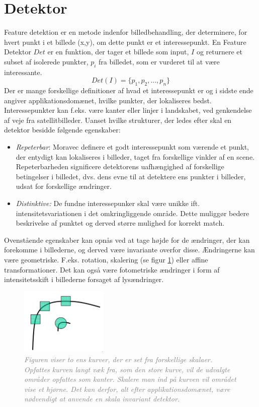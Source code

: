 \section{Detektor}\label{sec:detect}
Feature detektion er en metode indenfor billedbehandling, der determinere, for hvert punkt i et billede (x,y), om dette punkt er et interessepunkt.  En Feature Detektor $Det$ er en funktion, der tager et billede som input, $I$ og returnere et subset af isolerede punkter, $p_i$ fra billedet, som er vurderet til at være interessante. 
$$ Det(I)=\lbrace p_1,p_2,...,p_n \rbrace$$
Der er mange forskellige definitioner af hvad et interessepunkt er og i sidste ende angiver applikationsdomænet, hvilke punkter, der lokaliseres bedst. Interessepunkter kan f.eks. være kanter eller linjer i landskabet, ved genkendelse af veje fra satellitbilleder. Uanset hvilke strukturer, der ledes efter skal en detektor besidde følgende egenskaber:
\begin{itemize}
\item{\emph{Repeterbar}: Moravec \cite{moravec} definere et godt interessepunkt som værende et punkt, der entydigt kan lokaliseres i billeder, taget fra forskellige vinkler af en scene. Repeterbarheden significere detektorens uafhængighed af forskellige betingelser i billedet, dvs. dens evne til at detektere ens punkter i billeder, udsat for forskellige ændringer. }
\item{\emph{Distinktive:}
De fundne interessepunker skal være unikke ift. intensitetsvariationen i det omkringliggende område. Dette muliggør bedere beskrivelse af punktet og derved større mulighed for korrekt match.}
\end{itemize}
Ovenstående egenskaber kan opnås ved at tage højde for de ændringer, der kan forekomme i billederne, og derved være invariante overfor disse. Ændringerne kan være geometriske. F.eks. rotation, skalering (se figur \ref{fig:skal}) eller affine transformationer. Det kan også være fotometriske ændringer i form af intensitetsskift i billederne forsaget af lysændringer.
\begin{figure}[H]
    \centering
    \includegraphics[width=0.37\textwidth]{fig/28.png}
     \vspace{-1em}
    \begin{center}    
       \caption{\textcolor{gray}{\footnotesize \textit{Figuren viser to ens kurver, der er set fra forskellige skalaer. Opfattes kurven langt væk fra, som den store kurve, vil de udvalgte områder opfattes som kanter. Skalere man ind på kurven vil området vise et hjørne. Det kan derfor, alt efter applikationsdomænet, være nødvendigt at anvende en skala invariant detektor.}}}
    \label{fig:skal}
     \end{center}
     \vspace{-2.5em}
  \end{figure} \noindent
